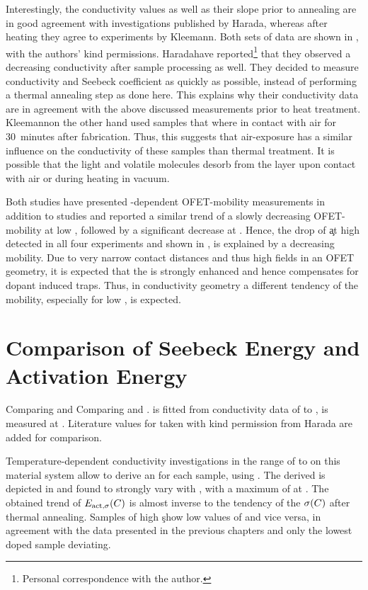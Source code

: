 Interestingly, the conductivity values as well as their slope prior to annealing are in good agreement with investigations published by Harada\etal\cite{Harada2010}, whereas after heating they agree to experiments by Kleemann\etal\cite{Kleemann2012a}. Both sets of data are shown in , with the authors' kind permissions.
%
Harada\etal have reported\footnote{Personal correspondence with the author.}
that they observed a decreasing conductivity after sample processing as well. They decided to measure conductivity and Seebeck coefficient as quickly as possible, instead of performing a thermal annealing step as done here. This explains why their conductivity data are in agreement with the above discussed measurements prior to heat treatment. Kleemann\etal on the other hand used samples that where in contact with air for 30~minutes after fabrication. Thus, this suggests that air-exposure has a similar influence on the conductivity of these samples than thermal treatment. It is possible that the light and volatile \FV molecules desorb from the layer upon contact with air or during heating in vacuum.

Both studies have presented \C-dependent OFET-mobility measurements in addition to \cLong studies and reported a similar trend of a slowly decreasing OFET-mobility at low \C, followed by a significant decrease at . Hence, the drop of \c at high \C detected in all four experiments and shown in , is explained by a decreasing mobility.
Due to very narrow contact distances and thus high fields in an OFET geometry, it is expected that the \nhLong is strongly enhanced and hence compensates for dopant induced traps. Thus, in conductivity geometry a different tendency of the mobility, especially for low \CLongs, is expected.

\section{Comparison of Seebeck Energy and Activation Energy}
\label{sec:ResP5-EsEact}

{Comparing \Eact and \Es}
{Comparing \EactLong \Eact and \EsLong \Es. \Eact is fitted from conductivity data of \T[25] to , \Es is measured at \Tm[40]. Literature values for \Es taken with kind permission from Harada\cite{Harada2010} are added for comparison.
}

Temperature-dependent conductivity investigations in the range of \T[25] to  on this material system allow to derive an \EactLongL for each sample, using . The derived \Eact is depicted in  and found to strongly vary with \CLong, with a maximum of \Eact[357] at \C[0.011]. The obtained trend of $\Eact(\C)$ is almost inverse to the tendency of the $\c(\C)$ after thermal annealing. Samples of high \c show low values of \Eact and vice versa, in agreement with the data presented in the previous chapters and only the lowest doped sample deviating.

